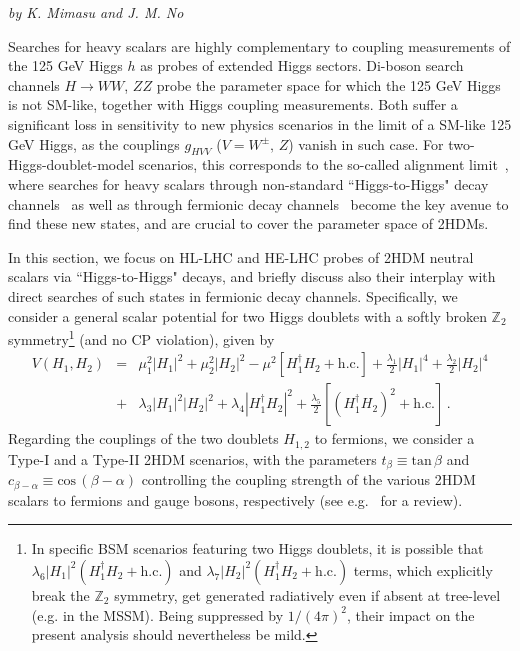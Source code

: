 
\begin{center}
 {\it{by K. Mimasu and J. M. No 
}}
\end{center}








Searches for heavy scalars are highly complementary to coupling measurements of the 125 GeV Higgs $h$ as probes of extended Higgs sectors. Di-boson search channels $H \to WW$, $ZZ$ probe the parameter space for which the 125 GeV Higgs is not SM-like, together with Higgs coupling measurements. Both suffer a significant loss in sensitivity to new physics scenarios in the limit of a SM-like 125 GeV Higgs, as the couplings $g_{HVV}$ ($V = W^{\pm},\,Z$) vanish in such case. For two-Higgs-doublet-model scenarios, this corresponds to the so-called alignment limit~\cite{Gunion:2002zf},
where searches for heavy scalars through non-standard ``Higgs-to-Higgs"
decay channels~\cite{Coleppa:2014hxa,Dorsch:2014qja,Li:2015lra,Kling:2016opi,Dorsch:2016tab} 
as well as through fermionic decay channels~\cite{Craig:2015jba,Gori:2016zto} become the key avenue to find these new states, and are crucial to cover the parameter space of 2HDMs.

In this section, we focus on HL-LHC and HE-LHC probes of 2HDM neutral scalars via ``Higgs-to-Higgs" decays, and briefly discuss also their interplay with direct searches of such states in fermionic decay channels. Specifically, we consider a general scalar potential for two Higgs doublets 
with a softly broken $\mathbb{Z}_2$ 
symmetry\footnote{In specific BSM scenarios featuring two Higgs doublets, it is possible that $\lambda_6 \left|H_1\right|^2 (H_1^{\dagger}H_2+\mathrm{h.c.})$  and $\lambda_7 \left|H_2\right|^2 (H_1^{\dagger}H_2+\mathrm{h.c.})$ terms, which explicitly break the $\mathbb{Z}_2$ symmetry, get generated radiatively even if absent at tree-level (e.g. in the MSSM). Being suppressed by $1/(4\pi)^2$, their impact on the present analysis should nevertheless be mild.} (and no CP violation), given by 
%
\begin{eqnarray}	
\label{2HDM_potential}
V(H_1,H_2) &= &\mu^2_1 \left|H_1\right|^2 + \mu^2_2\left|H_2\right|^2 - \mu^2\left[H_1^{\dagger}H_2+\mathrm{h.c.}\right] 
+\frac{\lambda_1}{2}\left|H_1\right|^4 +\frac{\lambda_2}{2}\left|H_2\right|^4 \nonumber \\
&+& \lambda_3 \left|H_1\right|^2\left|H_2\right|^2
+\lambda_4 \left|H_1^{\dagger}H_2\right|^2+ \frac{\lambda_5}{2}\left[\left(H_1^{\dagger}H_2\right)^2+\mathrm{h.c.}\right]\, . 
\end{eqnarray}
%
Regarding the couplings of the two doublets $H_{1,2}$ to fermions, we consider  
a Type-I and a Type-II 2HDM scenarios, with the parameters $t_{\beta} \equiv \mathrm{tan}\,\beta$ and $c_{\beta -\alpha} \equiv \mathrm{cos}\,(\beta-\alpha)$ controlling the coupling strength of the various 2HDM scalars to fermions and gauge bosons, respectively (see e.g.~\cite{Branco:2011iw} for a review).

